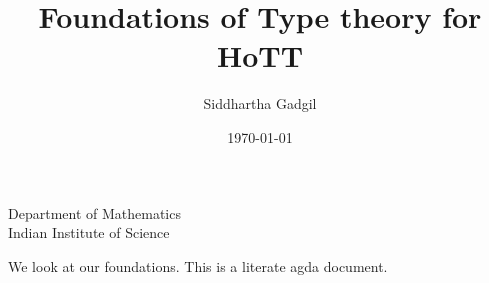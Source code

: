 \documentclass[10 pt.,handout]{beamer}
\theoremstyle{plain}
\theoremstyle{remark}
\begin{document}
\title{Foundations of Type theory for HoTT}

\author{Siddhartha Gadgil}


\institute
{
Department of Mathematics\\
  Indian Institute of Science}
  
\date{\today}

\maketitle








 



\beamerdefaultoverlayspecification{<+->}



We look at our foundations. This is a literate agda document.


\begin{code}\>\<%
\\
\>  \<%
\\
%
\\
\>\<\end{code}
\end{document}
